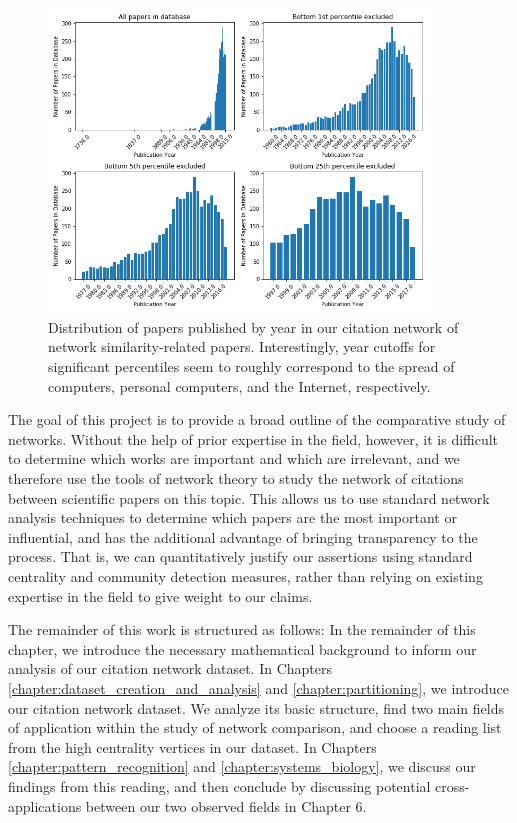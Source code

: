 \documentclass[12pt]{thesis}
\theoremstyle{plain}
\theoremstyle{definition}
\theoremstyle{remark}
\begin{document}
\begin{figure}[h!]
\centering
\includegraphics[width=0.9\textwidth]{year_distribution.png}
\caption{Distribution of papers published by year in our citation network of network similarity-related papers. Interestingly, year cutoffs for significant percentiles seem to roughly correspond to the spread of computers, personal computers, and the Internet, respectively.}
\label{fig:year_distributions}
\end{figure}

The goal of this project is to provide a broad outline of the comparative study of networks. Without the help of prior expertise in the field, however, it is difficult to determine which works are important and which are irrelevant, and we therefore use the tools of network theory to study the network of citations between scientific papers on this topic. This allows us to use standard network analysis techniques to determine which papers are the most important or influential, and has the additional advantage of bringing transparency to the process. That is, we can quantitatively justify our assertions using standard centrality and community detection measures, rather than relying on existing expertise in the field to give weight to our claims.

The remainder of this work is structured as follows: In the remainder of this chapter, we introduce the necessary mathematical background to inform our analysis of our citation network dataset. In Chapters \ref{chapter:dataset_creation_and_analysis} and \ref{chapter:partitioning}, we introduce our citation network dataset. We analyze its basic structure, find two main fields of application within the study of network comparison, and choose a reading list from the high centrality vertices in our dataset. In Chapters \ref{chapter:pattern_recognition} and \ref{chapter:systems_biology}, we discuss our findings from this reading, and then conclude by discussing potential cross-applications between our two observed fields in Chapter 6.
\end{document}
